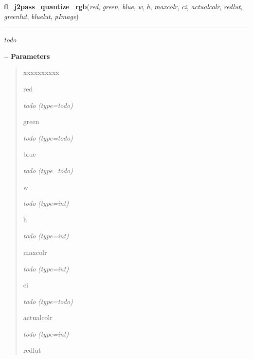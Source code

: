 \hspace{.8\funcindent}\begin{boxedminipage}{\funcwidth}

    \raggedright \textbf{fl\_j2pass\_quantize\_rgb}(\textit{red}, \textit{green}, \textit{blue}, \textit{w}, \textit{h}, \textit{maxcolr}, \textit{ci}, \textit{actualcolr}, \textit{redlut}, \textit{greenlut}, \textit{bluelut}, \textit{pImage})

    \vspace{-1.5ex}

    \rule{\textwidth}{0.5\fboxrule}
\setlength{\parskip}{2ex}

\emph{todo}

-{}-
\setlength{\parskip}{1ex}
      \textbf{Parameters}
      \vspace{-1ex}

      \begin{quote}
        \begin{Ventry}{xxxxxxxxxx}

          \item[red]


\emph{todo}
            {\it (type=\emph{todo})}

          \item[green]


\emph{todo}
            {\it (type=\emph{todo})}

          \item[blue]


\emph{todo}
            {\it (type=\emph{todo})}

          \item[w]


\emph{todo}
            {\it (type=int)}

          \item[h]


\emph{todo}
            {\it (type=int)}

          \item[maxcolr]


\emph{todo}
            {\it (type=int)}

          \item[ci]


\emph{todo}
            {\it (type=\emph{todo})}

          \item[actualcolr]


\emph{todo}
            {\it (type=int)}

          \item[redlut]



\end{Ventry}
\end{quote}
\end{boxedminipage}
